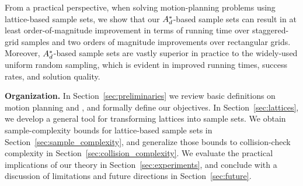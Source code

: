 From a practical perspective, when solving motion-planning problems using lattice-based sample sets, we show that our $A_d^*$-based sample sets can result in at least order-of-magnitude improvement in terms of running time over staggered-grid samples and two orders of magnitude improvements over rectangular grids. Moreover, $A_d^*$-based sample sets are vastly superior in practice to the widely-used uniform random sampling, which is evident in improved running times, success rates, and solution quality.

\vspace{5pt}
\noindent \textbf{Organization.} In Section~\ref{sec:preliminaries} we review basic definitions on motion planning and \decomps, and formally define our objectives. In Section~\ref{sec:lattices}, we develop a general tool for transforming lattices into \decomp sample sets. We obtain sample-complexity bounds for lattice-based sample sets in Section~\ref{sec:sample_complexity}, and generalize those bounds to collision-check complexity in Section~\ref{sec:collision_complexity}. We evaluate the practical implications of our theory in Section~\ref{sec:experiments}, and conclude with a discussion of limitations and future directions in Section~\ref{sec:future}.






